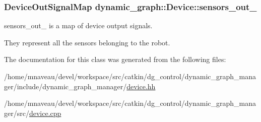 \subsubsection[{\texorpdfstring{sensors\+\_\+out\+\_\+}{sensors_out_}}]{\setlength{\rightskip}{0pt plus 5cm}Device\+Out\+Signal\+Map dynamic\+\_\+graph\+::\+Device\+::sensors\+\_\+out\+\_\+}\hypertarget{classdynamic__graph_1_1Device_ab397e65116cdc32ffa767bfc92c0b7e0}{}\label{classdynamic__graph_1_1Device_ab397e65116cdc32ffa767bfc92c0b7e0}


sensors\+\_\+out\+\_\+ is a map of device output signals. 

They represent all the sensors belonging to the robot. 

The documentation for this class was generated from the following files\+:\begin{DoxyCompactItemize}
\item 
/home/mnaveau/devel/workspace/src/catkin/dg\+\_\+control/dynamic\+\_\+graph\+\_\+manager/include/dynamic\+\_\+graph\+\_\+manager/\hyperlink{device_8hh}{device.\+hh}\item 
/home/mnaveau/devel/workspace/src/catkin/dg\+\_\+control/dynamic\+\_\+graph\+\_\+manager/src/\hyperlink{device_8cpp}{device.\+cpp}\end{DoxyCompactItemize}
